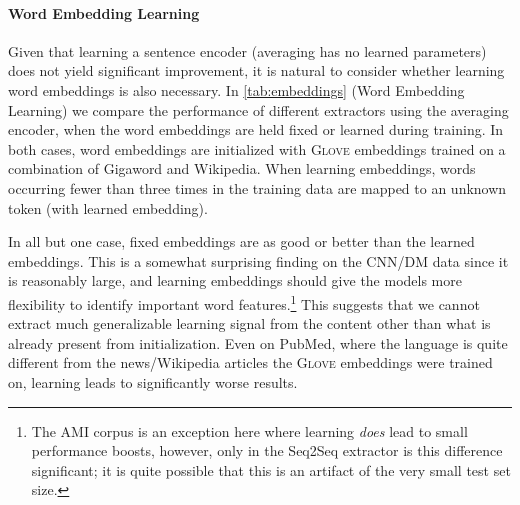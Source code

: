 \paragraph{Word Embedding Learning}
 Given that learning a sentence encoder (averaging has no learned parameters)
 does not yield significant improvement, it is natural to consider whether
 learning word embeddings is also necessary. 
 In \autoref{tab:embeddings} (Word Embedding Learning) we compare the 
 performance of different extractors
 using the averaging encoder, when the word embeddings are held fixed or 
 learned during training. In both cases, word embeddings are initialized with
 \textsc{Glove} embeddings trained on a combination of Gigaword and Wikipedia.
 When learning embeddings, words occurring 
 fewer than three times in the training data are mapped to an unknown
 token (with learned embedding).
 
 In all but one case,
fixed embeddings are as good or better than the learned embeddings.
This is a somewhat surprising finding on the CNN/DM data since it is reasonably
large, and learning embeddings should give the models more
flexibility to identify important word features.\footnote{The AMI corpus is an exception here where learning \emph{does} lead to small
performance boosts, however, only in the Seq2Seq extractor is this difference 
significant; it is quite possible that this is an artifact of the very small
test set size.}
This suggests that we cannot extract much generalizable learning signal 
from the content other than what is already present from initialization. 
Even on PubMed, where the language is quite different from the news/Wikipedia
articles the \textsc{Glove} embeddings were trained on, learning leads to 
significantly worse results.




